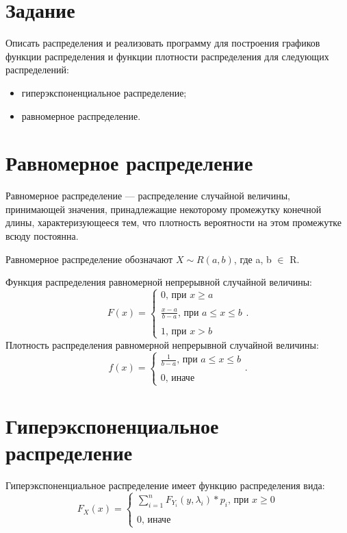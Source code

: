 \section*{Задание}
\quad Описать распределения и реализовать программу для построения графиков функции распределения и
функции плотности распределения для следующих распределений:
\begin{itemize}[label=---]
	\item гиперэкспоненциальное распределение;
	\item равномерное распределение.
\end{itemize}

\section*{Равномерное распределение}
\quad Равномерное распределение — распределение случайной величины, принимающей значения, принадлежащие некоторому промежутку конечной длины, характеризующееся тем, что плотность вероятности на этом промежутке всюду постоянна.

Равномерное распределение обозначают $X \sim R(a, b)$, где a, b $\in$ R. 

Функция распределения равномерной непрерывной случайной величины:
\begin{equation}
	F(x) = \begin{cases}
		0 \text{, при } x \geq a\\\\
		\frac{x-a}{b-a} \text{, при } a \leq x \leq b\\\\
		1 \text{, при } x > b
	\end{cases}.
\end{equation}
Плотность распределения равномерной непрерывной случайной величины:
\begin{equation}
	f(x) = \begin{cases}
		\frac{1}{b-a} \text{, при } a \leq x \leq b\\\\
		0 \text{, иначе }
	\end{cases}.
\end{equation}
\clearpage

\section*{Гиперэкспоненциальное распределение}
\quad 

Гиперэкспоненциальное распределение имеет функцию распределения вида:
\begin{equation}
	F_{X}(x) = \begin{cases}
	\sum_{i=1}^n F_{Y_{i}}(y, \lambda_{i}) * p_{i} \text{, при } x \geq 0\\\\
		0 \text{, иначе }
	\end{cases}
\end{equation}

